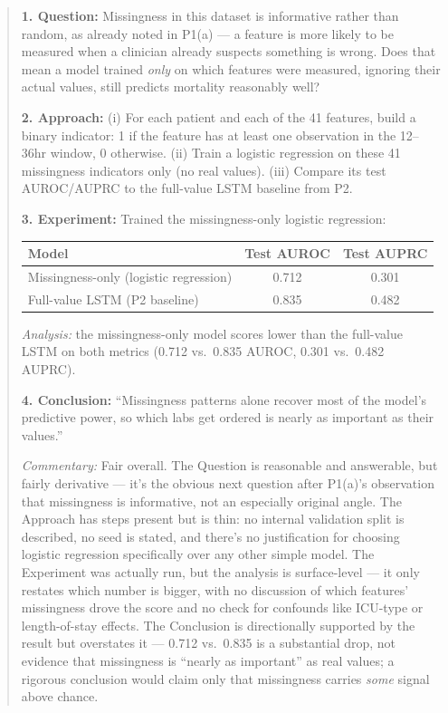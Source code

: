 \documentclass{article}
\begin{document}
\begin{quote}
\textbf{1. Question:} Missingness in this dataset is informative rather than random, as already noted in P1(a) --- a feature is more likely to be measured when a clinician already suspects something is wrong. Does that mean a model trained \emph{only} on which features were measured, ignoring their actual values, still predicts mortality reasonably well?

\textbf{2. Approach:}
(i) For each patient and each of the 41 features, build a binary indicator: 1 if the feature has at least one observation in the 12--36hr window, 0 otherwise.
(ii) Train a logistic regression on these 41 missingness indicators only (no real values).
(iii) Compare its test AUROC/AUPRC to the full-value LSTM baseline from P2.

\textbf{3. Experiment:} Trained the missingness-only logistic regression:

\begin{center}
\begin{tabular}{lcc}
\hline
Model & Test AUROC & Test AUPRC \\
\hline
Missingness-only (logistic regression) & 0.712 & 0.301 \\
Full-value LSTM (P2 baseline) & 0.835 & 0.482 \\
\hline
\end{tabular}
\end{center}

\emph{Analysis:} the missingness-only model scores lower than the full-value LSTM on both metrics (0.712 vs.\ 0.835 AUROC, 0.301 vs.\ 0.482 AUPRC).

\textbf{4. Conclusion:} ``Missingness patterns alone recover most of the model's predictive power, so which labs get ordered is nearly as important as their values.''

\emph{Commentary:} Fair overall. The Question is reasonable and answerable, but fairly derivative --- it's the obvious next question after P1(a)'s observation that missingness is informative, not an especially original angle. The Approach has steps present but is thin: no internal validation split is described, no seed is stated, and there's no justification for choosing logistic regression specifically over any other simple model. The Experiment was actually run, but the analysis is surface-level --- it only restates which number is bigger, with no discussion of which features' missingness drove the score and no check for confounds like ICU-type or length-of-stay effects. The Conclusion is directionally supported by the result but overstates it --- 0.712 vs.\ 0.835 is a substantial drop, not evidence that missingness is ``nearly as important'' as real values; a rigorous conclusion would claim only that missingness carries \emph{some} signal above chance.
\end{quote}
\end{document}
